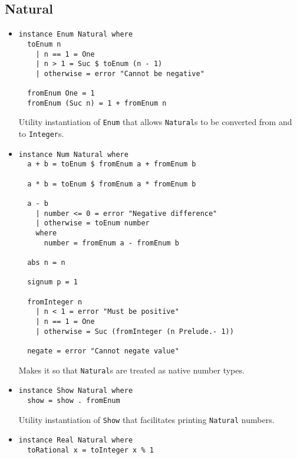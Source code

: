 \documentclass[11pt,a4paper]{article}
\begin{document}
\subsection{Natural}

\begin{itemize}
    \item \begin{lstlisting}
instance Enum Natural where
  toEnum n
    | n == 1 = One
    | n > 1 = Suc $ toEnum (n - 1)
    | otherwise = error "Cannot be negative"

  fromEnum One = 1
  fromEnum (Suc n) = 1 + fromEnum n
    \end{lstlisting}

          Utility instantiation of \lstinline{Enum} that allows \lstinline{Natural}s to be converted from and to \lstinline{Integer}s.

    \item \begin{lstlisting}
instance Num Natural where
  a + b = toEnum $ fromEnum a + fromEnum b

  a * b = toEnum $ fromEnum a * fromEnum b

  a - b
    | number <= 0 = error "Negative difference"
    | otherwise = toEnum number
    where
      number = fromEnum a - fromEnum b

  abs n = n

  signum p = 1

  fromInteger n
    | n < 1 = error "Must be positive"
    | n == 1 = One
    | otherwise = Suc (fromInteger (n Prelude.- 1))

  negate = error "Cannot negate value"
    \end{lstlisting}

          Makes it so that \lstinline{Natural}s are treated as native number types.

    \item \begin{lstlisting}
instance Show Natural where
  show = show . fromEnum
    \end{lstlisting}

          Utility instantiation of \lstinline{Show} that facilitates printing \lstinline{Natural} numbers.

    \item \begin{lstlisting}
instance Real Natural where
  toRational x = toInteger x % 1
    \end{lstlisting}


\end{itemize}
\end{document}
